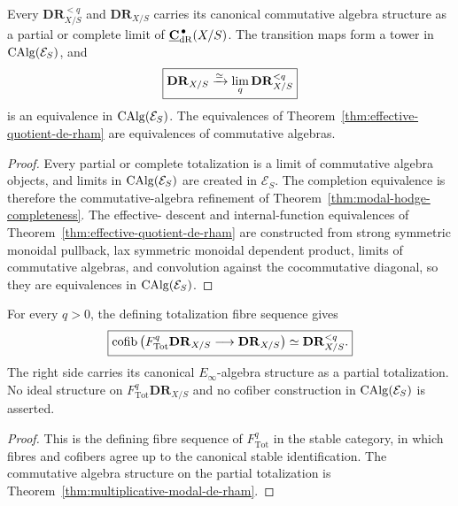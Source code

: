 \begin{theorem}
\label{thm:multiplicative-modal-de-rham}
Every \(\mathbf{DR}_{X/S}^{<q}\) and \(\mathbf{DR}_{X/S}\) carries its canonical commutative algebra
structure as a partial or complete limit of
\(\underline{\mathbf C}_{\mathrm{dR}}^{\,\bullet}(X/S)\).  The transition maps form a tower in
\(\operatorname{CAlg}(\mathcal E_S)\), and
\[
\boxed{
    \mathbf{DR}_{X/S}
    \xrightarrow{\simeq}
    \operatorname*{lim}_q\mathbf{DR}_{X/S}^{<q}
}
\]
is an equivalence in \(\operatorname{CAlg}(\mathcal E_S)\).  The equivalences of
Theorem~\ref{thm:effective-quotient-de-rham} are equivalences of commutative algebras.
\end{theorem}

\begin{proof}
Every partial or complete totalization is a limit of commutative algebra objects, and limits in
\(\operatorname{CAlg}(\mathcal E_S)\) are created in \(\mathcal E_S\).  The completion equivalence is therefore
the commutative-algebra refinement of Theorem~\ref{thm:modal-hodge-completeness}.  The effective-
descent and internal-function equivalences of Theorem~\ref{thm:effective-quotient-de-rham} are
constructed from strong symmetric monoidal pullback, lax symmetric monoidal dependent product,
limits of commutative algebras, and convolution against the cocommutative diagonal, so they are
equivalences in \(\operatorname{CAlg}(\mathcal E_S)\).
\end{proof}

\begin{proposition}
\label{prop:modal-hodge-multiplicativity}
For every \(q>0\), the defining totalization fibre sequence gives
\[
\boxed{
    \operatorname{cofib}
    \left(
        F_{\mathrm{Tot}}^q\mathbf{DR}_{X/S}
        \longrightarrow
        \mathbf{DR}_{X/S}
    \right)
    \simeq
    \mathbf{DR}_{X/S}^{<q}.
}
\]
The right side carries its canonical \(E_\infty\)-algebra structure as a partial totalization.  No
ideal structure on \(F_{\mathrm{Tot}}^q\mathbf{DR}_{X/S}\) and no cofiber construction in
\(\operatorname{CAlg}(\mathcal E_S)\) is asserted.
\end{proposition}

\begin{proof}
This is the defining fibre sequence of \(F_{\mathrm{Tot}}^q\) in the stable category, in which fibres and
cofibers agree up to the canonical stable identification.  The commutative algebra structure on the
partial totalization is Theorem~\ref{thm:multiplicative-modal-de-rham}.
\end{proof}

